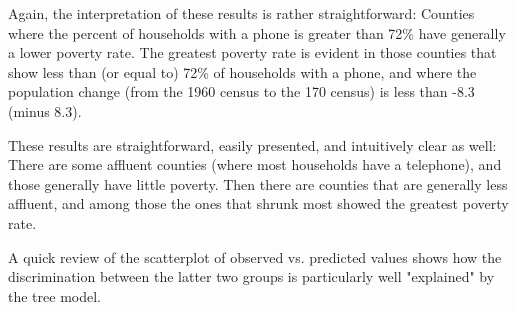 \documentclass[caret-main.tex]{subfiles}
\begin{document}
Again, the interpretation of these results is rather straightforward: Counties where the percent of households with a phone is greater than 72\% have generally a lower poverty rate. The greatest poverty rate is evident in those counties that show less than (or equal to) 72\% of households with a phone, and where the population change (from the 1960 census to the 170 census) is less than -8.3 (minus 8.3). 

These results are straightforward, easily presented, and intuitively clear as well: There are some affluent counties (where most households have a telephone), and those generally have little poverty. Then there are counties that are generally less affluent, and among those the ones that shrunk most showed the greatest poverty rate. 

A quick review of the scatterplot of observed vs. predicted values shows how the discrimination between the latter two groups is particularly well "explained" by the tree model.

\end{document}
